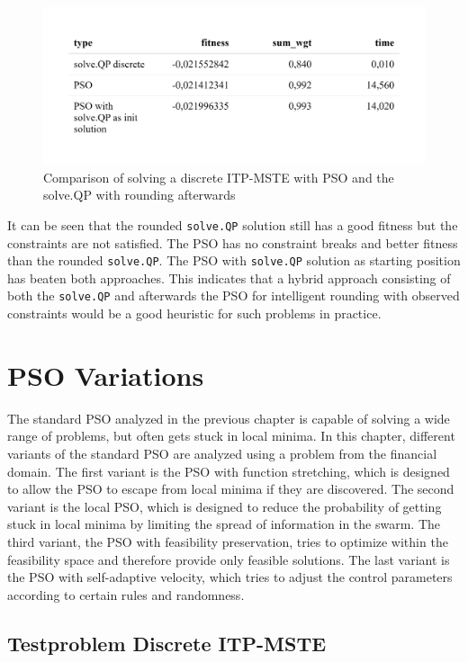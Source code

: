 \documentclass[
  oneside, a4paper, 12pt, openany]{book}
\theoremstyle{definition}
\theoremstyle{definition}
\theoremstyle{definition}
\theoremstyle{definition}
\theoremstyle{remark}
\begin{document}
\begin{figure}[H]
\includegraphics{Master_Thesis_files/figure-latex/pso9-1} \caption{Comparison of solving a discrete ITP-MSTE with PSO and the solve.QP with rounding afterwards}\label{fig:pso9}
\end{figure}

It can be seen that the rounded \texttt{solve.QP} solution still has a good fitness but the constraints are not satisfied. The PSO has no constraint breaks and better fitness than the rounded \texttt{solve.QP}. The PSO with \texttt{solve.QP} solution as starting position has beaten both approaches. This indicates that a hybrid approach consisting of both the \texttt{solve.QP} and afterwards the PSO for intelligent rounding with observed constraints would be a good heuristic for such problems in practice.

\hypertarget{psovariants}{%
\chapter{PSO Variations}\label{psovariants}}

The standard PSO analyzed in the previous chapter is capable of solving a wide range of problems, but often gets stuck in local minima. In this chapter, different variants of the standard PSO are analyzed using a problem from the financial domain. The first variant is the PSO with function stretching, which is designed to allow the PSO to escape from local minima if they are discovered. The second variant is the local PSO, which is designed to reduce the probability of getting stuck in local minima by limiting the spread of information in the swarm. The third variant, the PSO with feasibility preservation, tries to optimize within the feasibility space and therefore provide only feasible solutions. The last variant is the PSO with self-adaptive velocity, which tries to adjust the control parameters according to certain rules and randomness.

\hypertarget{testproblem-discrete-itp-mste}{%
\section{Testproblem Discrete ITP-MSTE}\label{testproblem-discrete-itp-mste}}
\end{document}
